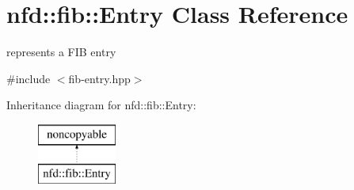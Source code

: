 \hypertarget{classnfd_1_1fib_1_1Entry}{}\section{nfd\+:\+:fib\+:\+:Entry Class Reference}
\label{classnfd_1_1fib_1_1Entry}


represents a F\+IB entry  




{\ttfamily \#include $<$fib-\/entry.\+hpp$>$}

Inheritance diagram for nfd\+:\+:fib\+:\+:Entry\+:\begin{figure}[H]
\begin{center}
\leavevmode
\includegraphics[height=2.000000cm]{classnfd_1_1fib_1_1Entry}
\end{center}
\end{figure}
